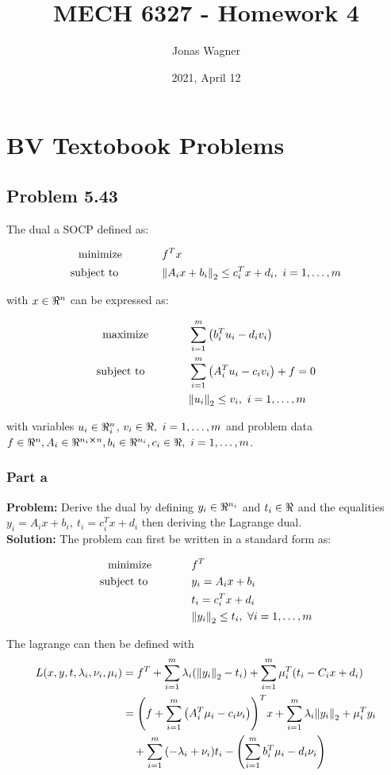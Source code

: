 \documentclass[letter]{article}
\title{MECH 6327 - Homework 4}
\author{Jonas Wagner}
\date{2021, April 12}
\newcommand{\optpblm}[3][eq:default]{
	\begin{equation}\label{#1}
		\begin{aligned}
			\text{minimize} \hspace{0.5in} &#2\vspace{5pt}\\
			\text{subject to \hspace{0.5in}} &#3
		\end{aligned}	
	\end{equation}
}
\newcommand{\maxpblm}[3][eq:default]{
	\begin{equation}\label{#1}
		\begin{aligned}
			\text{maximize} \hspace{0.5in} &#2\vspace{5pt}\\
			\text{subject to \hspace{0.5in}} &#3
		\end{aligned}	
	\end{equation}
}
\begin{document}
\maketitle

\newpage
\tableofcontents

\newpage
\section*{BV Textobook Problems}
\subsection{Problem 5.43}
The dual a SOCP defined as:
\optpblm{f^T x}{\norm{A_i x + b_i}_2 \leq c_i^T x + d_i, \ i = 1,\dots,m}
with $x \in \real^n$ can be expressed as:
\maxpblm{\sum_{i=1}^m \qty(b_i^T u_i - d_i v_i)}{
	  \sum_{i=1}^m \qty(A_i^T u_i - c_i v_i) + f = 0\\
	& \norm{u_i}_2 \leq v_i, \ i = 1,\dots,m}
with variables $u_i \in \real^n_i$, $v_i \in \real, \ i=1,\dots,m$ and problem data $f\in \real^n, A_i \in \real^{n_i \cross n}, b_i \in \real^{n_i}, c_i \in \real, \ i = 1,\dots,m$.\\

\newpage
\subsubsection{Part a}
\textbf{Problem:}
Derive the dual by defining $y_i \in \real^{n_i}$ and $t_i \in \real$ and the equalities $y_i = A_i x + b_i, \ t_i = c_i^T x + d_i$ then deriving the Lagrange dual.\\

\noindent
\textbf{Solution:}
The problem can first be written in a standard form as:
\optpblm{f^T}{
	y_i = A_i x + b_i\\
	&t_i = c_i^T x + d_i\\
	&\norm{y_i}_2 \leq t_i, \ \forall i = 1, \dots, m}

The lagrange can then be defined with
\begin{align}
	L(x,y,t, \lambda_i, \nu_i, \mu_i)
	&= f^T 
	+ \sum_{i=1}^m \lambda_i \qty(\norm{y_i}_2 - t_i)
	+ \sum_{i=1}^m \mu_i^T (t_i - C_i x + d_i)\\
	&= \qty(f + \sum_{i=1}^m \qty(A_i^T \mu_i - c_i \nu_i))^T x
	+ \sum_{i=1}^m \lambda_i \norm{y_i}_2 + \mu_i^T y_i \nonumber\\
	&\ \ \ + \sum_{i=1}^m \qty(-\lambda_i + \nu_i) t_i
	- \qty(\sum_{i=1}^m b_i^T \mu_i - d_i \nu_i)
\end{align}
\end{document}
